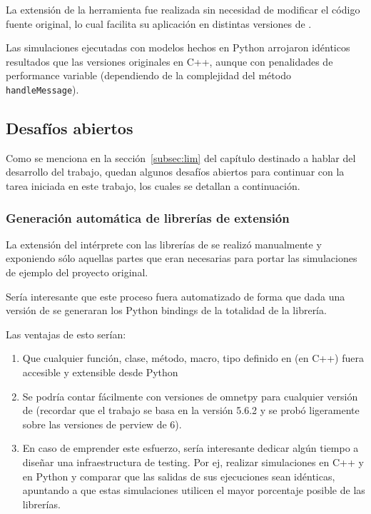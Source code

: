 \documentclass[]{article}
\begin{document}
La extensión de la herramienta \omnetpp{} fue realizada sin necesidad de modificar el código fuente original, lo cual facilita su aplicación en distintas versiones de \omnetpp{}.

Las simulaciones ejecutadas con modelos hechos en Python arrojaron idénticos
resultados que las versiones originales en C++, aunque con penalidades de
performance variable (dependiendo de la complejidad del método \verb!handleMessage!).

\subsection{Desafíos abiertos}

Como se menciona en la sección~\ref{subsec:lim} del capítulo destinado a hablar
del desarrollo del trabajo, quedan algunos desafíos abiertos para continuar con
la tarea iniciada en este trabajo, los cuales se detallan a continuación.

\subsubsection{Generación automática de librerías de extensión}

La extensión del intérprete con las librerías de \omnetpp{} se realizó
manualmente y exponiendo sólo aquellas partes que eran necesarias para portar
las simulaciones de ejemplo del proyecto original.

Sería interesante que este proceso fuera automatizado de forma que dada una
versión de \omnetpp{} se generaran los Python bindings de la totalidad de la
librería.

Las ventajas de esto serían:

\begin{enumerate}
    \item Que cualquier función, clase, método, macro, tipo definido en
    \omnetpp{} (en C++) fuera accesible y extensible desde Python

    \item Se podría contar fácilmente con versiones de omnetpy para cualquier
    versión de \omnetpp{} (recordar que el trabajo se basa en la versión 5.6.2 y se
    probó ligeramente sobre las versiones de perview de \omnetpp{} 6).

    \item En caso de emprender este esfuerzo, sería interesante dedicar algún
    tiempo a diseñar una infraestructura de testing. Por ej, realizar simulaciones
    en C++ y en Python y comparar que las salidas de sus ejecuciones sean
    idénticas, apuntando a que estas simulaciones utilicen el mayor porcentaje
    posible de las librerías.
\end{enumerate}
\end{document}
